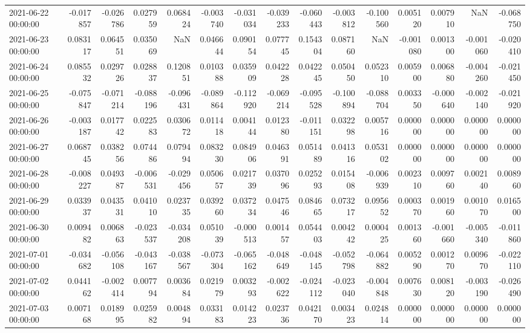 \begin{tabular}{lrrrrrrrrrrrrrr}
2021-06-22 00:00:00 & -0.017857 & -0.026786 & 0.027959 & 0.068424 & -0.003740 & -0.031034 & -0.039233 & -0.060443 & -0.003812 & -0.100560 & 0.005120 & 0.007910 & NaN & -0.068750 \\
2021-06-23 00:00:00 & 0.083117 & 0.064551 & 0.035069 & NaN & 0.046644 & 0.090154 & 0.077745 & 0.154304 & 0.087160 & NaN & -0.001080 & 0.001300 & -0.001060 & -0.020410 \\
2021-06-24 00:00:00 & 0.085532 & 0.029726 & 0.028837 & 0.120851 & 0.010388 & 0.035909 & 0.042228 & 0.042245 & 0.050450 & 0.052310 & 0.005900 & 0.006880 & -0.004260 & -0.021450 \\
2021-06-25 00:00:00 & -0.075847 & -0.071214 & -0.088196 & -0.096431 & -0.089864 & -0.112920 & -0.069214 & -0.095528 & -0.100894 & -0.088704 & 0.003350 & -0.000640 & -0.002140 & -0.021920 \\
2021-06-26 00:00:00 & -0.003187 & 0.017742 & 0.022583 & 0.030672 & 0.011418 & 0.004144 & 0.012380 & -0.011151 & 0.032298 & 0.005716 & 0.000000 & 0.000000 & 0.000000 & 0.000000 \\
2021-06-27 00:00:00 & 0.068745 & 0.038256 & 0.074486 & 0.079494 & 0.083230 & 0.084906 & 0.046391 & 0.051489 & 0.041316 & 0.053102 & 0.000000 & 0.000000 & 0.000000 & 0.000000 \\
2021-06-28 00:00:00 & -0.008227 & 0.049387 & -0.006531 & -0.029456 & 0.050657 & 0.021739 & 0.037096 & 0.025293 & 0.015408 & -0.006939 & 0.002310 & 0.009760 & 0.002140 & 0.008960 \\
2021-06-29 00:00:00 & 0.033937 & 0.043531 & 0.041010 & 0.023735 & 0.039260 & 0.037234 & 0.047546 & 0.084665 & 0.073217 & 0.095652 & 0.000370 & 0.001960 & 0.001070 & 0.016500 \\
2021-06-30 00:00:00 & 0.009482 & 0.006863 & -0.023537 & -0.034208 & 0.051039 & -0.000513 & 0.001457 & 0.054403 & 0.004242 & 0.000425 & 0.001360 & -0.001660 & -0.005340 & -0.011860 \\
2021-07-01 00:00:00 & -0.034682 & -0.056108 & -0.043167 & -0.038567 & -0.073304 & -0.065162 & -0.048649 & -0.048145 & -0.052798 & -0.064882 & 0.005290 & 0.001270 & 0.009670 & -0.022110 \\
2021-07-02 00:00:00 & 0.044162 & -0.002414 & 0.007794 & 0.003684 & 0.021979 & 0.003293 & -0.002622 & -0.024112 & -0.023040 & -0.004848 & 0.007630 & 0.008120 & -0.003190 & -0.026490 \\
2021-07-03 00:00:00 & 0.007168 & 0.018995 & 0.025982 & 0.004894 & 0.033183 & 0.014223 & 0.023736 & 0.042170 & 0.003423 & 0.024814 & 0.000000 & 0.000000 & 0.000000 & 0.000000 \\

\end{tabular}
